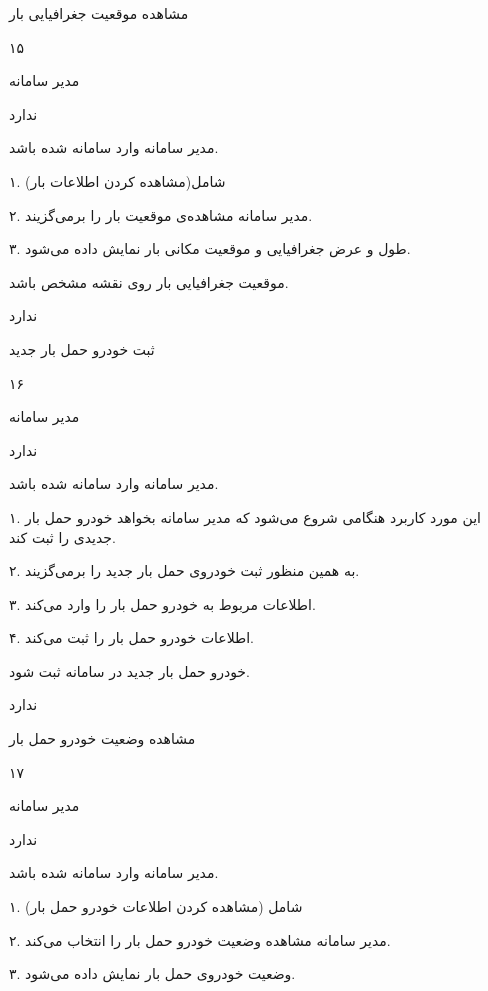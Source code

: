 مشاهده موقعیت جغرافیایی بار

۱۵

مدیر سامانه

ندارد

مدیر سامانه وارد سامانه شده باشد.


۱. شامل(مشاهده کردن اطلاعات بار)

۲. مدیر سامانه مشاهده‌ی موقعیت بار را برمی‌گزیند.

۳. طول و عرض جغرافیایی و موقعیت مکانی بار نمایش داده می‌شود.

موقعیت جغرافیایی بار روی نقشه مشخص باشد.

ندارد

\newpage

ثبت خودرو حمل بار جدید

۱۶

مدیر سامانه

ندارد

مدیر سامانه وارد سامانه شده باشد.


۱. این مورد کاربرد هنگامی شروع می‌شود که مدیر سامانه بخواهد خودرو حمل بار جدیدی را ثبت کند.

۲. به همین منظور ثبت خودروی حمل بار جدید را برمی‌گزیند.

۳. اطلاعات مربوط به خودرو حمل بار را وارد می‌کند.

۴. اطلاعات خودرو حمل بار را ثبت می‌کند.

خودرو حمل بار جدید در سامانه ثبت شود.

ندارد

\newpage

مشاهده وضعیت خودرو حمل بار

۱۷

مدیر سامانه

ندارد

مدیر سامانه وارد سامانه شده باشد.


۱. شامل (مشاهده کردن اطلاعات خودرو حمل بار)

۲. مدیر سامانه مشاهده وضعیت خودرو حمل بار را انتخاب می‌کند.

۳. وضعیت خودروی حمل بار نمایش داده می‌شود.

